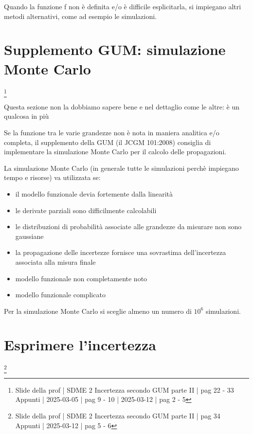 Quando la funzione f non è definita e/o è difficile esplicitarla, si impiegano altri metodi alternativi, come ad esempio le simulazioni. \newline 

\newpage

\section{Supplemento GUM: simulazione Monte Carlo}
\footnote{Slide della prof | SDME 2 Incertezza secondo GUM parte II | pag 22 - 33 \\  
Appunti | 2025-03-05 | pag 9 - 10 | 2025-03-12 | pag 2 - 5}

\begin{tcolorbox}
    Questa sezione non la dobbiamo sapere bene e nel dettaglio come le altre: è un qualcosa in più
\end{tcolorbox}

Se la funzione tra le varie grandezze non è nota in maniera analitica e/o completa, il supplemento della GUM (il JCGM 101:2008) 
consiglia di implementare la simulazione Monte Carlo per il calcolo  delle propagazioni. \newline 

La simulazione Monte Carlo (in generale tutte le simulazioni perchè impiegano tempo e risorse) va utilizzata se: 

\begin{itemize}
    \item il modello funzionale devia fortemente dalla linearità 
    \item le derivate parziali sono difficilmente calcolabili 
    \item le distribuzioni di probabilità associate alle grandezze da misurare non sono gaussiane 
    \item la propagazione delle incertezze fornisce una sovrastima dell'incertezza associata alla misura finale 
    \item modello funzionale non completamente noto 
    \item modello funzionale complicato
\end{itemize}

Per la simulazione Monte Carlo si sceglie almeno un numero di $10^{6}$ simulazioni. \newline 

\newpage 

\section{Esprimere l'incertezza}
\footnote{Slide della prof | SDME 2 Incertezza secondo GUM parte II | pag 34 \\  
Appunti | 2025-03-12 | pag 5 - 6}

